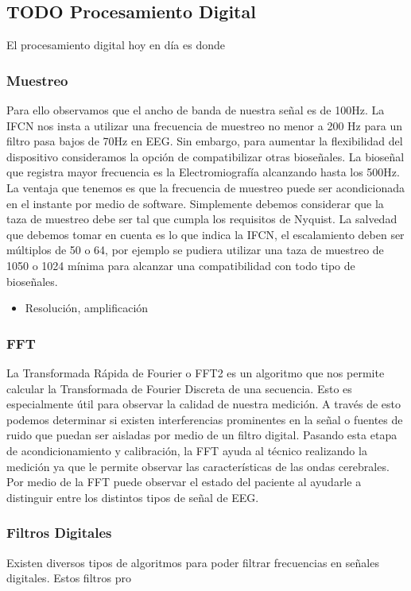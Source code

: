\subsection{{\bfseries\sffamily TODO} Procesamiento Digital}
\label{sec:org5023843}
El procesamiento digital hoy en día es donde
\subsubsection{Muestreo}
\label{sec:org9536c6c}
Para ello observamos que el ancho de banda de nuestra señal es de 100Hz. La IFCN nos insta a utilizar una frecuencia de muestreo no menor a 200 Hz para un filtro pasa bajos de 70Hz en EEG. Sin embargo, para aumentar la flexibilidad del dispositivo consideramos la opción de compatibilizar otras bioseñales. La bioseñal que registra mayor frecuencia es la Electromiografía alcanzando hasta los 500Hz. La ventaja que tenemos es que la frecuencia de muestreo puede ser acondicionada en el instante por medio de software. Simplemente debemos considerar que la taza de muestreo debe ser tal que cumpla los requisitos de Nyquist. La salvedad que debemos tomar en cuenta es lo que indica la IFCN, el escalamiento deben ser múltiplos de 50 o 64, por ejemplo se pudiera utilizar una taza de muestreo de 1050 o 1024 mínima para alcanzar una compatibilidad con todo tipo de bioseñales.
\begin{itemize}
\item Resolución, amplificación
\end{itemize}
\subsubsection{FFT}
\label{sec:org5bcafe4}
La Transformada Rápida de Fourier o FFT2 es un algoritmo que nos permite calcular la Transformada de Fourier Discreta de una secuencia. Esto es especialmente útil para observar la calidad de nuestra medición. A través de esto podemos determinar si existen interferencias prominentes en la señal o fuentes de ruido que puedan ser aisladas por medio de un filtro digital. Pasando esta etapa de acondicionamiento y calibración, la FFT ayuda al técnico realizando la medición ya que le permite observar las características de las ondas cerebrales. Por medio de la FFT puede observar el estado del paciente al ayudarle a distinguir entre los distintos tipos de señal de EEG.

\subsubsection{Filtros Digitales}
\label{sec:org15b7de6}
Existen diversos tipos de algoritmos para poder filtrar frecuencias en señales digitales. Estos filtros pro

